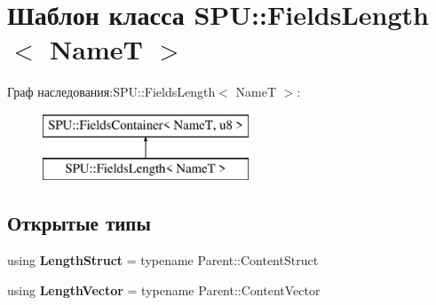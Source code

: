 \hypertarget{class_s_p_u_1_1_fields_length}{}\section{Шаблон класса S\+PU\+:\+:Fields\+Length$<$ NameT $>$}
\label{class_s_p_u_1_1_fields_length}
Граф наследования\+:S\+PU\+:\+:Fields\+Length$<$ NameT $>$\+:\begin{figure}[H]
\begin{center}
\leavevmode
\includegraphics[height=2.000000cm]{class_s_p_u_1_1_fields_length}
\end{center}
\end{figure}
\subsection*{Открытые типы}
\begin{DoxyCompactItemize}
\item 
\mbox{\label{class_s_p_u_1_1_fields_length_af4bea5ce47fb204a757126230fb909c4}} 
using {\bfseries Length\+Struct} = typename Parent\+::\+Content\+Struct
\item 
\mbox{\label{class_s_p_u_1_1_fields_length_a2cb4735c3795ae52d6756fbd922c14e6}} 
using {\bfseries Length\+Vector} = typename Parent\+::\+Content\+Vector
\end{DoxyCompactItemize}
